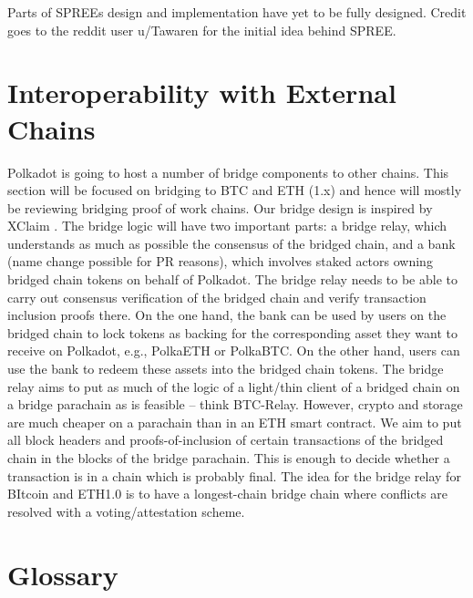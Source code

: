 Parts of SPREEs design and implementation have yet to be fully designed. Credit goes to the reddit user u/Tawaren for the initial idea behind SPREE.

\section{Interoperability with External Chains}\label{sec:bridge}

Polkadot is going to host a number of bridge components to other chains. This section will be focused on bridging to BTC and ETH (1.x) and hence will mostly be reviewing bridging proof of work chains. Our bridge design is inspired by XClaim \cite{Zamyatin:2019:XClaim}.
The bridge logic will have two important parts: a bridge relay, which understands as much as possible the consensus of the bridged chain, and a bank (name change possible for PR reasons), which involves staked actors owning bridged chain tokens on behalf of Polkadot.
The bridge relay needs to be able to carry out consensus verification of the bridged chain and verify transaction inclusion proofs there. On the one hand, the bank can be used by users on the bridged chain to lock tokens as backing for the corresponding asset they want to receive on Polkadot, e.g., PolkaETH or PolkaBTC. On the other hand, users can use the bank to redeem these assets into the bridged chain tokens.
The bridge relay aims to put as much of the logic of a light/thin client of a bridged chain on a bridge parachain as is feasible – think BTC-Relay. However, crypto and storage are much cheaper on a parachain than in an ETH smart contract. We aim to put all block headers and proofs-of-inclusion of certain transactions of the bridged chain in the blocks of the bridge parachain. This is enough to decide whether a transaction is in a chain which is probably final. The idea for the bridge relay for BItcoin and ETH1.0 is to have a longest-chain bridge chain where conflicts are resolved with a voting/attestation scheme. 



\section{Glossary}



